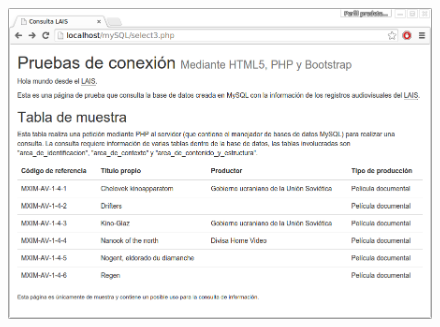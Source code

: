 \documentclass{beamer}
\begin{document}
\begin{frame}
	\begin{figure}[H]
		\centering
		\includegraphics[keepaspectratio=true,width=\linewidth]{Prototipo_01.png}
		\label{fig:prueba_conexion}
	\end{figure}
\end{frame}


\end{document}

